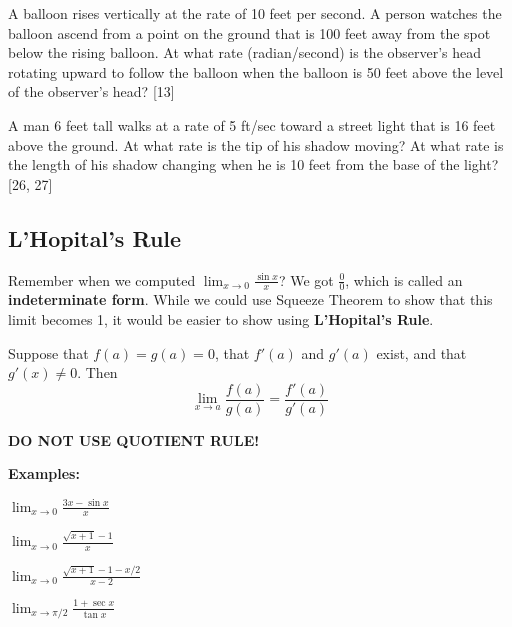 \documentclass[addpoints, 12pt]{exam}
\begin{document}
\begin{questions}
    
    \question A balloon rises vertically at the rate of 10 feet per second.  A person watches the balloon ascend from a point on the ground that is 100 feet away from the spot below the rising balloon.  At what rate (radian/second) is the observer’s head rotating upward to follow the balloon when the balloon is 50 feet above the level of the observer’s head?  [13]
    
    \question A man 6 feet tall walks at a rate of 5 ft/sec toward a street light that is 16 feet above the ground.  At what rate is the tip of his shadow moving?  At what rate is the length of his shadow changing when he is 10 feet from the base of the light? [26, 27]
    
    
    
\end{questions}






\newpage
{}
\subsection*{L'Hopital's Rule}
Remember when we computed $\displaystyle\lim_{x\to0}\frac{\sin x}{x}$? We got $\frac{0}{0}$, which is called an \textbf{indeterminate form}. While we could use Squeeze Theorem to show that this limit becomes 1, it would be easier to show using \textbf{L'Hopital's Rule}.

\begin{tcolorbox}[title= L'HOPITAL'S RULE,colframe=black,sharp corners,colback=white,colbacktitle=white,coltitle=black,boxrule=1pt]

    Suppose that $f(a)=g(a)=0$, that $f'(a)$ and $g'(a)$ exist, and that $g'(x)\ne0$. Then
    \[\lim_{x\to a}\frac{f(a)}{g(a)}=\frac{f'(a)}{g'(a)}\]
    
\end{tcolorbox}

\begin{center}
    \textbf{\large DO NOT USE QUOTIENT RULE!}
\end{center}
\noindent\textbf{Examples:}
\begin{questions}
    \question $\displaystyle \lim_{x\to0}\frac{3x-\sin x}{x}$
    
    \question $\displaystyle \lim_{x\to0}\frac{\sqrt{x+1}-1}{x}$
    
    \question $\displaystyle \lim_{x\to0}\frac{\sqrt{x+1}-1-x/2}{x-2}$
    
    \question $\displaystyle \lim_{x\to\pi/2}\frac{1+\sec x}{\tan x}$
\end{questions}
\end{document}
